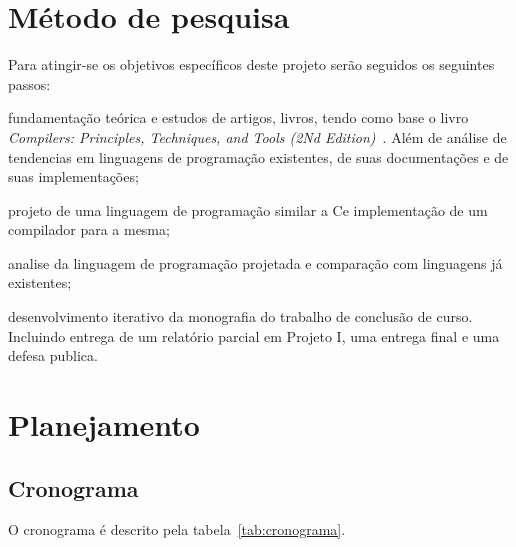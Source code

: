 \documentclass[
  12pt,
  openright,
  twoside,
  a4paper,
  english,
  brazil
]{abntex2}
\begin{document}
\chapter{Método de pesquisa}\label{cap:metodo_de_pesquisa}

Para atingir-se os objetivos específicos deste projeto serão seguidos os seguintes passos:
\begin{alineas}
  \item fundamentação teórica e estudos de artigos, livros, tendo como base o livro \textit{Compilers: Principles, Techniques, and Tools (2Nd Edition)}~\cite{Aho:2006:CPT:1177220}.
    Além de análise de tendencias em linguagens de programação existentes, de suas documentações e de suas implementações;
  \item projeto de uma linguagem de programação similar a C\@ e implementação de um compilador para a mesma;
  \item analise da linguagem de programação projetada e comparação com linguagens já existentes;
  \item desenvolvimento iterativo da monografia do trabalho de conclusão de curso.
    Incluindo entrega de um relatório parcial em Projeto I, uma entrega final e uma defesa publica.
\end{alineas}

\chapter{Planejamento}

\section{Cronograma}\label{cap:cronograma}

O cronograma é descrito pela tabela~\ref{tab:cronograma}.
\end{document}
